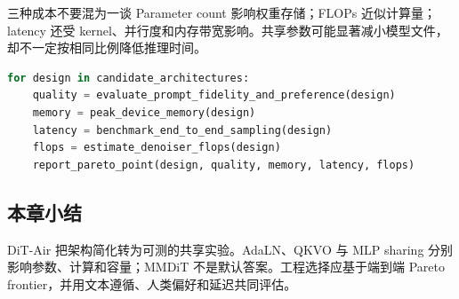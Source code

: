 \begin{importantbox}{三种成本不要混为一谈}
Parameter count 影响权重存储；FLOPs 近似计算量；latency 还受 kernel、并行度和内存带宽影响。共享参数可能显著减小模型文件，却不一定按相同比例降低推理时间。
\end{importantbox}

\begin{lstlisting}[language=Python,caption={用 Pareto 指标比较共享方案，而不是只排单一质量分数}]
for design in candidate_architectures:
    quality = evaluate_prompt_fidelity_and_preference(design)
    memory = peak_device_memory(design)
    latency = benchmark_end_to_end_sampling(design)
    flops = estimate_denoiser_flops(design)
    report_pareto_point(design, quality, memory, latency, flops)
\end{lstlisting}

\subsection{本章小结}

DiT-Air 把架构简化转为可测的共享实验。AdaLN、QKVO 与 MLP sharing 分别影响参数、计算和容量；MMDiT 不是默认答案。工程选择应基于端到端 Pareto frontier，并用文本遵循、人类偏好和延迟共同评估。


